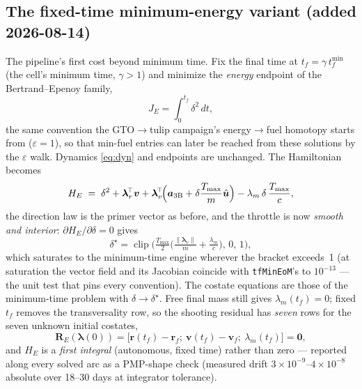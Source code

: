 \documentclass[11pt]{article}
\newcommand{\Rv}{\bm{r}}
\newcommand{\Vv}{\bm{v}}
\newcommand{\lr}{\bm{\lambda}_r}
\newcommand{\lv}{\bm{\lambda}_v}
\newcommand{\uh}{\hat{\bm{u}}}
\begin{document}
\subsection{The fixed-time minimum-energy variant (added 2026-08-14)}
\label{sec:minenergy}

The pipeline's first cost beyond minimum time. Fix the final time at
$t_f = \gamma\,t_f^{\min}$ (the cell's minimum time, $\gamma>1$) and minimize
the \emph{energy} endpoint of the Bertrand--Epenoy family,
\begin{equation}
J_E = \int_0^{t_f} \delta^2\,dt ,
\end{equation}
the same convention the GTO$\to$tulip campaign's energy$\to$fuel homotopy
starts from ($\varepsilon=1$), so that min-fuel entries can later be reached
from these solutions by the $\varepsilon$ walk. Dynamics \eqref{eq:dyn} and
endpoints are unchanged. The Hamiltonian becomes
\begin{equation}
H_E \;=\; \delta^2 + \lr^{\!\top}\Vv
      + \lv^{\!\top}\!\Big(\bm a_{\rm 3B} + \delta\frac{T_{\max}}{m}\uh\Big)
      - \lambda_m\,\delta\,\frac{T_{\max}}{c},
\end{equation}
the direction law is the primer vector as before, and the throttle is now
\emph{smooth and interior}: $\partial H_E/\partial\delta = 0$ gives
\begin{equation}
\delta^\star = \operatorname{clip}\!\Big(\tfrac{T_{\max}}{2}\Big(\tfrac{\lVert\lv\rVert}{m}
      + \tfrac{\lambda_m}{c}\Big),\,0,\,1\Big),
\end{equation}
which saturates to the minimum-time engine wherever the bracket exceeds~1
(at saturation the vector field and its Jacobian coincide with
\texttt{tfMinEoM}'s to $10^{-13}$ --- the unit test that pins every
convention). The costate equations are those of the minimum-time problem
with $\delta\to\delta^\star$. Free final mass still gives
$\lambda_m(t_f)=0$; fixed $t_f$ removes the transversality row, so the
shooting residual has \emph{seven} rows for the seven unknown initial
costates,
\begin{equation}
\bm R_E(\bm\lambda(0)) = \big[\Rv(t_f)-\Rv_f;\ \Vv(t_f)-\Vv_f;\ \lambda_m(t_f)\big] = \bm 0 ,
\end{equation}
and $H_E$ is a \emph{first integral} (autonomous, fixed time) rather than
zero --- reported along every solved arc as a PMP-shape check (measured
drift $3\times10^{-9}$--$4\times10^{-8}$ absolute over 18--30 days at
integrator tolerance).
\end{document}
